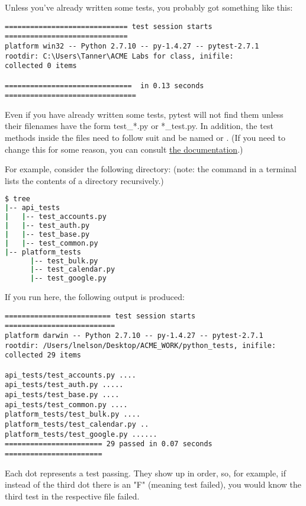 Unless you've already written some tests, you probably got something like this:

\begin{lstlisting}
============================= test session starts =============================
platform win32 -- Python 2.7.10 -- py-1.4.27 -- pytest-2.7.1
rootdir: C:\Users\Tanner\ACME Labs for class, inifile:
collected 0 items

==============================  in 0.13 seconds ===============================
\end{lstlisting}


Even if you have already written some tests, pytest will not find them unless their filenames have the form test\_*.py or *\_test.py.  In addition, the test methods inside the files need to follow suit and be named  or .  (If you need to change this for some reason, you can consult \href{http://pytest.org/latest/example/pythoncollection.html} {the documentation}.)


For example, consider the following directory: (note: the  command in a terminal lists the contents of a directory recursively.)
\begin{lstlisting}[language=bash]
$ tree
|-- api_tests
|   |-- test_accounts.py
|   |-- test_auth.py
|   |-- test_base.py
|   |-- test_common.py
|-- platform_tests
      |-- test_bulk.py
      |-- test_calendar.py
      |-- test_google.py
\end{lstlisting}

If you run  here, the following output is produced:

\begin{lstlisting}
========================= test session starts ==========================
platform darwin -- Python 2.7.10 -- py-1.4.27 -- pytest-2.7.1
rootdir: /Users/lnelson/Desktop/ACME_WORK/python_tests, inifile:
collected 29 items

api_tests/test_accounts.py ....
api_tests/test_auth.py .....
api_tests/test_base.py ....
api_tests/test_common.py ....
platform_tests/test_bulk.py ....
platform_tests/test_calendar.py ..
platform_tests/test_google.py ......
======================= 29 passed in 0.07 seconds =======================
\end{lstlisting}
\begin{info}
Each dot represents a test passing. They show up in order, so, for example, if instead of the third dot there is an "F" (meaning test failed), you would know the third test in the respective file failed.
\end{info}

